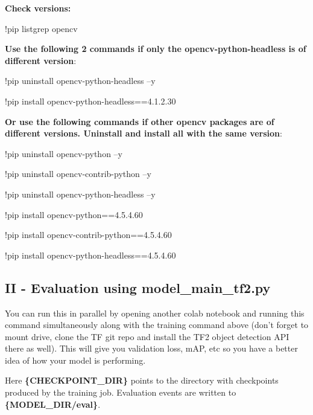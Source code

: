 \documentclass[11pt]{article}
\begin{document}
\textbf{Check versions:}

!pip list\textbar grep opencv

\textbf{Use the following 2 commands if only the opencv-python-headless
is of different version}:

!pip uninstall opencv-python-headless --y

!pip install opencv-python-headless==4.1.2.30

\textbf{Or use the following commands if other opencv packages are of
different versions. Uninstall and install all with the same version}:

!pip uninstall opencv-python --y

!pip uninstall opencv-contrib-python --y

!pip uninstall opencv-python-headless --y

!pip install opencv-python==4.5.4.60

!pip install opencv-contrib-python==4.5.4.60

!pip install opencv-python-headless==4.5.4.60

    \hypertarget{ii---evaluation-using-model_main_tf2.py}{%
\subsection{II - Evaluation using
model\_main\_tf2.py}\label{ii---evaluation-using-model_main_tf2.py}}

You can run this in parallel by opening another colab notebook and
running this command simultaneously along with the training command
above (don't forget to mount drive, clone the TF git repo and install
the TF2 object detection API there as well). This will give you
validation loss, mAP, etc so you have a better idea of how your model is
performing.

Here \textbf{\{CHECKPOINT\_DIR\}} points to the directory with
checkpoints produced by the training job. Evaluation events are written
to \textbf{\{MODEL\_DIR/eval\}}.
\end{document}
